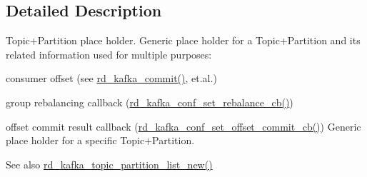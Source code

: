 \subsection{Detailed Description}
Topic+Partition place holder. Generic place holder for a Topic+Partition and its related information used for multiple purposes:
\begin{DoxyItemize}
\item consumer offset (see \hyperlink{rdkafka_8h_ab96539928328f14c3c9177ea0c896c87}{rd\_\-kafka\_\-commit()}, et.al.)
\item group rebalancing callback (\hyperlink{rdkafka_8h_a10db731dc1a295bd9884e4f8cb199311}{rd\_\-kafka\_\-conf\_\-set\_\-rebalance\_\-cb()})
\item offset commit result callback (\hyperlink{rdkafka_8h_a1ab8bb9e8d8cdd5906f9e060b506f2eb}{rd\_\-kafka\_\-conf\_\-set\_\-offset\_\-commit\_\-cb()}) Generic place holder for a specific Topic+Partition. \begin{DoxySeeAlso}{See also}
\hyperlink{rdkafka_8h_afb87d24333b6ad5a7415b06882f06b2a}{rd\_\-kafka\_\-topic\_\-partition\_\-list\_\-new()} 
\end{DoxySeeAlso}

\end{DoxyItemize}

